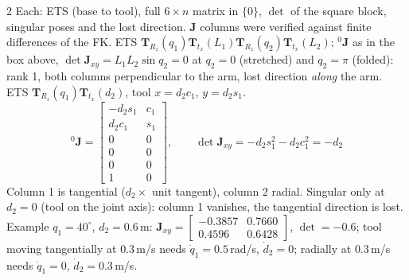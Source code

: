 \begin{multicols}{2}
Each: ETS (base to tool), full $6\times n$ matrix in $\{0\}$, $\det$ of the square block, singular poses and the lost direction. $\mathbf J$ columns were verified against finite differences of the FK. \chk
{}
ETS $\mathbf T_{R_z}(q_1)\mathbf T_{t_x}(L_1)\mathbf T_{R_z}(q_2)\mathbf T_{t_x}(L_2)$; ${}^0\mathbf J$ as in the box above, $\det\mathbf J_{xy}=L_1L_2\sin q_2=0$ at $q_2=0$ (stretched) and $q_2=\pi$ (folded): rank 1, both columns perpendicular to the arm, lost direction \emph{along} the arm.
ETS $\mathbf T_{R_z}(q_1)\mathbf T_{t_x}(d_2)$, tool $x=d_2c_1$, $y=d_2s_1$.
\[{}^0\mathbf J=\begin{bmatrix}-d_2s_1&c_1\\d_2c_1&s_1\\0&0\\0&0\\0&0\\1&0\end{bmatrix},\qquad\det\mathbf J_{xy}=-d_2s_1^2-d_2c_1^2=-d_2\]
Column 1 is tangential ($d_2\times$ unit tangent), column 2 radial. Singular only at $d_2=0$ (tool on the joint axis): column 1 vanishes, the tangential direction is lost. Example $q_1=40^\circ$, $d_2=0.6$\,m: $\mathbf J_{xy}=\begin{bmatrix}-0.3857&0.7660\\0.4596&0.6428\end{bmatrix}$, $\det=-0.6$; tool moving tangentially at $0.3$\,m/s needs $\dot q_1=0.5$\,rad/s, $\dot d_2=0$; radially at $0.3$\,m/s needs $\dot q_1=0$, $\dot d_2=0.3$\,m/s. \chk
\begin{center}
\end{center}
\end{multicols}
